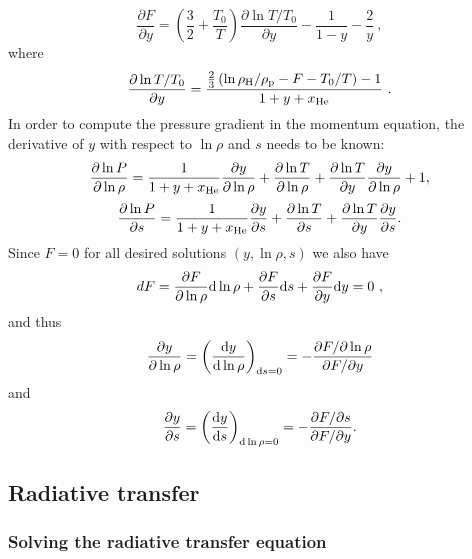 \documentclass[\mydriver,12pt,twoside,notitlepage,a4paper]{article}
\begin{document}
\begin{equation}
\frac{\partial F}{\partial y}
=\left(\frac{3}{2}+\frac{T_0}{T}\right)\frac{\partial\ln T/T_0}{\partial y}
 -\frac{1}{1-y}-\frac{2}{y}\ ,
\end{equation}
where
\begin{equation}
\frac{\partial\ln T/T_0}{\partial y}
=\frac{\frac{2}{3}\left(\ln\rho_{\rm H}/\rho_{\rm p}-F-T_0/T\right)-1}
      {1+y+x_{\rm He}}\ .
\end{equation}
In order to compute the pressure gradient in the momentum equation,
the derivative of $y$ with respect
to $\ln\rho$ and $s$ needs to be known:
\begin{equation}
\frac{\partial\ln P}{\partial\ln\rho}
=\frac{1}{1+y+x_{\rm He}}\frac{\partial y}{\partial\ln\rho}
+\frac{\partial\ln T}{\partial\ln\rho}
+\frac{\partial\ln T}{\partial y}\frac{\partial y}{\partial\ln\rho}+1,
\end{equation}
\begin{equation}
\frac{\partial\ln P}{\partial s}
=\frac{1}{1+y+x_{\rm He}}\frac{\partial y}{\partial s}
+\frac{\partial\ln T}{\partial s}
+\frac{\partial\ln T}{\partial y}\frac{\partial y}{\partial s}.
\end{equation}
Since $F=0$ for all desired solutions $(y,\ln\rho,s)$ we also have
\begin{equation}
dF=\frac{\partial F}{\partial\ln\rho}{\rm d}\ln\rho
   +\frac{\partial F}{\partial s}{\rm d} s
   +\frac{\partial F}{\partial y}{\rm d} y=0\ ,
\end{equation}
and thus
\begin{equation}
\frac{\partial y}{\partial\ln\rho}
=\left(\frac{{\rm d} y}{{\rm d}\ln\rho}\right)_{{\rm d} s=0}
=-\frac{\partial F/\partial\ln\rho}{\partial F/\partial y}
\end{equation}
and
\begin{equation}
\frac{\partial y}{\partial s}
=\left(\frac{{\rm d} y}{{\rm d} s}\right)_{{\rm d}\ln\rho=0}
=-\frac{\partial F/\partial s}{\partial F/\partial y}.
\end{equation}


\subsection{Radiative transfer}
\label{S-radi-trans}

\subsubsection{Solving the radiative transfer equation}
\end{document}
